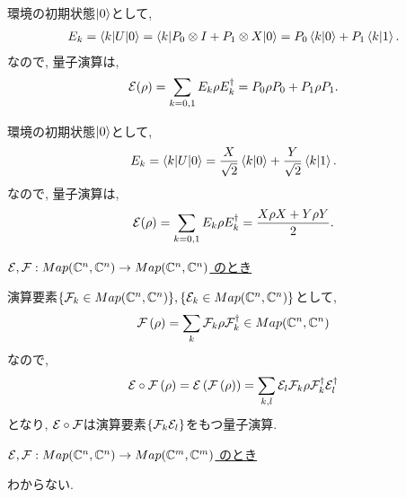 \begin{ex}
    \label{ex8.4}
    環境の初期状態$\ket{0}$として,
    \begin{align*}
        E_k
        = \braket{k | U | 0}
        = \braket{k | P_0 \otimes I + P_1 \otimes X | 0}
        = P_0 \braket{k|0} + P_1 \braket{k|1}.
    \end{align*}
    なので, 量子演算は,
    \begin{align*}
        \mathcal{E} (\rho)
        = \sum_{k = 0, 1} E_k \rho E_k^\dagger
        = P_0 \rho P_0 + P_1 \rho P_1.
    \end{align*}
\end{ex}

\begin{ex}
    \label{ex8.5}
    環境の初期状態$\ket{0}$として,
    \begin{align*}
        E_k
        = \braket{k | U | 0}
        = \frac{X}{\sqrt{2}} \braket{k|0} + \frac{Y}{\sqrt{2}} \braket{k|1}.
    \end{align*}
    なので, 量子演算は,
    \begin{align*}
        \mathcal{E} (\rho)
        = \sum_{k = 0, 1} E_k \rho E_k^\dagger
        = \frac{X \rho X + Y \rho Y}{2}.
    \end{align*}
\end{ex}

\begin{ex}
    \label{ex8.6}
    \par
    \underline{
        $\mathcal{E}, \mathcal{F} :
            Map(\mathbb{C}^n, \mathbb{C}^n) \to  Map(\mathbb{C}^n, \mathbb{C}^n)$
        のとき
    }
    \par
    演算要素$\{\mathcal{F}_k \in Map(\mathbb{C}^n, \mathbb{C}^n)\}, \{\mathcal{E}_k \in Map(\mathbb{C}^n, \mathbb{C}^n) \}$として,
    \begin{align*}
        \mathcal{F} \left( \rho \right) = \sum_k \mathcal{F}_k \rho \mathcal{F}_k^\dagger \in Map(\mathbb{C}^n, \mathbb{C}^n)
    \end{align*}
    なので,
    \begin{align*}
        \mathcal{E} \circ \mathcal{F} \left( \rho \right)
        =
        \mathcal{E} \left( \mathcal{F} \left( \rho \right) \right)
        =
        \sum_{k, l} \mathcal{E}_l \mathcal{F}_k \rho \mathcal{F}_k^\dagger \mathcal{E}_l^\dagger
    \end{align*}
    となり, $\mathcal{E} \circ \mathcal{F}$は演算要素$\{ \mathcal{F}_k \mathcal{E}_l \}$をもつ量子演算.
    \par
    \underline{
        $\mathcal{E}, \mathcal{F} :
            Map(\mathbb{C}^n, \mathbb{C}^n) \to  Map(\mathbb{C}^m, \mathbb{C}^m)$
        のとき
    }
    \par
    わからない.
\end{ex}

